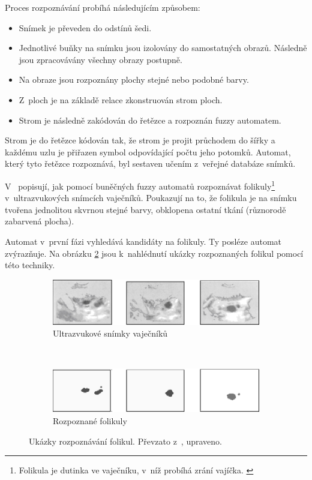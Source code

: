 Proces rozpoznávání probíhá následujícím způsobem:
\begin{itemize}
 \item Snímek je převeden do odstínů šedi.
 \item Jednotlivé buňky na snímku jsou izolovány do samostatných obrazů. Následně jsou zpracovávány všechny obrazy postupně.
 \item Na obraze jsou rozpoznány plochy stejné nebo podobné barvy.
 \item Z~ploch je na základě relace  zkonstruován strom ploch.
 \item Strom je následně zakódován do řetězce a rozpoznán fuzzy automatem.
\end{itemize}

Strom je do řetězce kódován tak, že strom je projit průchodem do šířky a každému uzlu je přiřazen symbol odpovídající počtu jeho potomků. Automat, který tyto řetězce rozpoznává, byl sestaven učením z~veřejné databáze snímků.

V~\cite{WanJiaZhoDu-ImProcBasFuzCelAuMod} popisují, jak pomocí buněčných fuzzy automatů rozpoznávat folikuly\footnote{Folikula je dutinka ve vaječníku, v~níž probíhá zrání vajíčka. \cite{web-Folikul}} v~ultrazvukových snímcích vaječníků. Poukazují na to, že folikula je na snímku tvořena jednolitou skvrnou stejné barvy, obklopena ostatní tkání (různorodě zabarvená plocha).

Automat v~první fázi vyhledává kandidáty na folikuly. Ty posléze automat zvýrazňuje. Na obrázku \ref{img:Follicles} jsou k~nahlédnutí ukázky rozpoznaných folikul pomocí této techniky.

\begin{figure}
  \begin{subfigure}[t]{\textwidth}
    \includegraphics[width=\textwidth]{genimg-follicles-1}
    \caption{Ultrazvukové snímky vaječníků} \label{img:Follicles:Screens}
  \end{subfigure}
  \\
  \begin{subfigure}[t]{\textwidth}
    \includegraphics[width=\textwidth]{genimg-follicles-2}
    \caption{Rozpoznané folikuly}
  \end{subfigure}
 
  \caption[Ukázky rozpoznávání folikul]{Ukázky rozpoznávání folikul. Převzato z~\cite{WanJiaZhoDu-ImProcBasFuzCelAuMod}, upraveno.} \label{img:Follicles}
\end{figure}

